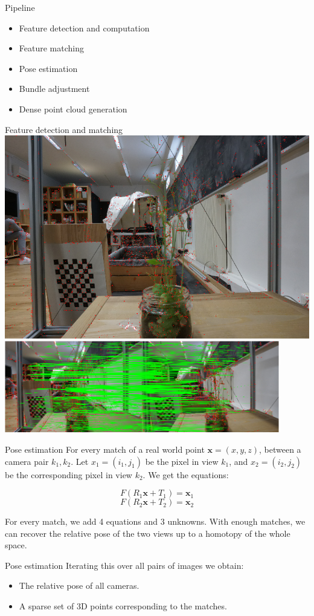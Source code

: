 \documentclass[aspectratio=169]{beamer}
\begin{document}
\begin{frame}{Pipeline}
    \begin{itemize}
        \item Feature detection and computation
        \item Feature matching
        \item Pose estimation
        \item Bundle adjustment
        \item Dense point cloud generation
    \end{itemize}
\end{frame}
\begin{frame}{Feature detection and matching}
    \centering
    \includegraphics[width=.45\textwidth]{images/sift.png}
    \includegraphics[width=0.9\textwidth]{images/matches.png}
\end{frame}
\begin{frame}{Pose estimation}
    For every match of a real world point $\mathbf{x} = (x, y, z)$, between a camera pair $k_1, k_2$. Let $x_1 = (i_1, j_1)$ be the pixel in view $k_1$, and $x_2 = (i_2, j_2)$ be the corresponding pixel in view $k_2$. We get the equations:

    $$F(R_1 \mathbf{x} + T_1) = \mathbf{x}_1$$
    $$F(R_2 \mathbf{x} + T_2) = \mathbf{x}_2$$

    For every match, we add 4 equations and 3 unknowns. With enough matches, we can recover the relative pose of the two views up to a homotopy of the whole space.
\end{frame}
\begin{frame}{Pose estimation}
    Iterating this over all pairs of images we obtain:
    \begin{itemize}
        \item The relative pose of all cameras.
        \item A sparse set of 3D points corresponding to the matches.
    \end{itemize}
\end{frame}
\end{document}
